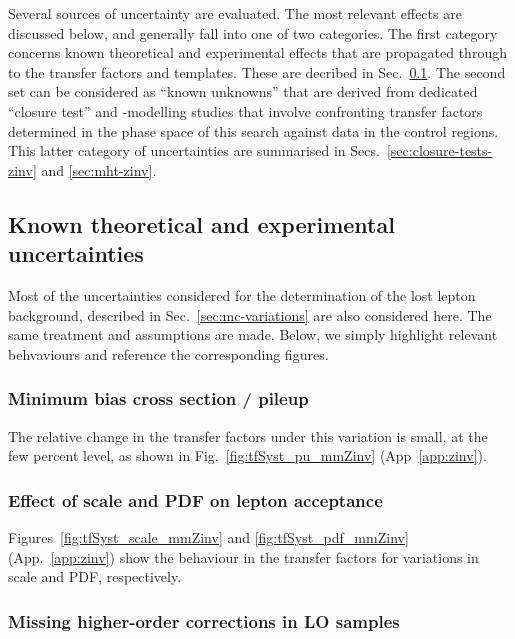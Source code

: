 Several sources of uncertainty are evaluated.  The most relevant
effects are discussed below, and generally fall into one of two
categories. The first category concerns known theoretical and
experimental effects that are propagated through to the transfer
factors and \HTmiss templates. These are decribed in
Sec.~\ref{sec:mc-variations-zinv}. The second set can be considered as
``known unknowns'' that are derived from dedicated ``closure test''
and \HTmiss-modelling studies that involve confronting transfer
factors determined in the phase space of this search against data in
the control regions. This latter category of uncertainties are
summarised in Secs.~\ref{sec:closure-tests-zinv} and
\ref{sec:mht-zinv}.

\subsection{Known theoretical and experimental uncertainties}
\label{sec:mc-variations-zinv}

Most of the uncertainties considered for the determination of the lost
lepton background, described in Sec.~\ref{sec:mc-variations} are also
considered here. The same treatment and assumptions are made. Below,
we simply highlight relevant behvaviours and reference the
corresponding figures. 

\subsubsection{Minimum bias cross section / pileup}
\label{sec:tfSyst_pu-zinv}

The relative change in the transfer factors under this variation is
small, at the few percent level, as shown in
Fig.~\ref{fig:tfSyst_pu_mmZinv} (App~\ref{app:zinv}).

\subsubsection{Effect of scale and PDF on lepton acceptance}
\label{sec:tfSyst_pdf-zinv}

Figures~\ref{fig:tfSyst_scale_mmZinv} and \ref{fig:tfSyst_pdf_mmZinv}
(App.~\ref{app:zinv}) show the behaviour in the transfer factors for
variations in scale and PDF, respectively.

\subsubsection{Missing higher-order corrections in LO \texorpdfstring{\MADGRAPH}{MadGraph}
  samples}
\label{sec:nlo-zinv}

